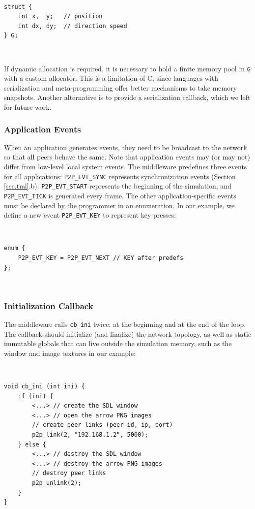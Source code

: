 \documentclass[10pt,journal,compsoc]{IEEEtran}
\newcommand{\code}[1]  {\texttt{\small{#1}}}
\begin{document}
{\footnotesize
~
\begin{verbatim}
struct {
    int x,  y;   // position
    int dx, dy;  // direction speed
} G;
\end{verbatim}
~
}

If dynamic allocation is required, it is necessary to hold a finite memory
pool in \code{G} with a custom allocator.
This is a limitation of C, since languages with serialization and
meta-programming offer better mechanisms to take memory snapshots.
Another alternative is to provide a serialization callback, which we left for
future work.

\subsubsection{Application Events}
\label{sec.tml.api.events}

When an application generates events, they need to be broadcast to the network
so that all peers behave the same.
Note that application events may (or may not) differ from low-level local
system events.
%
The middleware predefines three events for all applications:
    \code{P2P\_EVT\_SYNC} represents synchronization events
        (Section \ref{sec.tml}.b).
    \code{P2P\_EVT\_START} represents the beginning of the simulation, and
    \code{P2P\_EVT\_TICK} is generated every frame.
The other application-specific events must be declared by the programmer in an
enumeration.
In our example, we define a new event \code{P2P\_EVT\_KEY} to represent key
presses:

{\footnotesize
~
\begin{verbatim}
enum {
    P2P_EVT_KEY = P2P_EVT_NEXT // KEY after predefs
};
\end{verbatim}
~
}

\subsubsection{Initialization Callback}
\label{sec.tml.api.cb_ini}

The middleware calls \code{cb\_ini} twice: at the beginning and at the end of
the loop.
The callback should initialize (and finalize) the network topology, as well as
static immutable globals that can live outside the simulation memory, such as
the window and image textures in our example:

{\footnotesize
~
\begin{verbatim}
void cb_ini (int ini) {
    if (ini) {
        <...> // create the SDL window
        <...> // open the arrow PNG images
        // create peer links (peer-id, ip, port)
        p2p_link(2, "192.168.1.2", 5000);
    } else {
        <...> // destroy the SDL window
        <...> // destroy the arrow PNG images
        // destroy peer links
        p2p_unlink(2);
    }
}
\end{verbatim}
~
}
\end{document}
